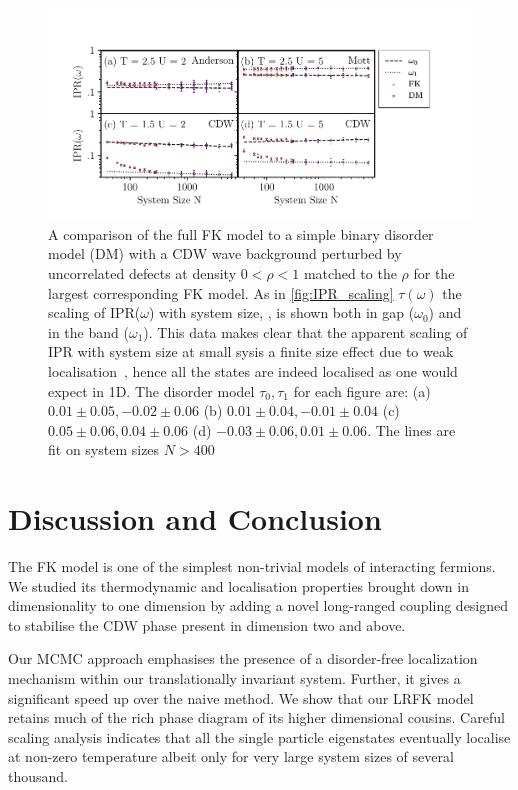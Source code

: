 \hypertarget{fig:DM_IPR_scaling}{%
\begin{figure}
\centering
\includegraphics[width=1\textwidth,height=\textheight]{figure_code/fk_chapter/disorder_model/DM_IPR_scaling}
\caption[{FK model compared to binary disorder model: IPR Scaling}]{A comparison of the full FK model to a simple binary disorder model (DM) with a CDW wave background perturbed by uncorrelated defects at density \(0 < \rho < 1\) matched to the \(\rho\) for the largest corresponding FK model. As in \cref{fig:IPR_scaling} \(\tau(\omega)\) the scaling of IPR(\(\omega\)) with system size, , is shown both in gap (\(\omega_0\)) and in the band (\(\omega_1\)). This data makes clear that the apparent scaling of IPR with system size at small sysis a finite size effect due to weak localisation~\autocite{antipovInteractionTunedAndersonMott2016}, hence all the states are indeed localised as one would expect in 1D. The disorder model \(\tau_0,\tau_1\) for each figure are: (a) \(0.01\pm0.05, -0.02\pm0.06\) (b) \(0.01\pm0.04, -0.01\pm0.04\) (c) \(0.05\pm0.06, 0.04\pm0.06\) (d) \(-0.03\pm0.06, 0.01\pm0.06\). The lines are fit on system sizes \(N > 400\)}
\label{fig:DM_IPR_scaling}
\end{figure}
}

\hypertarget{fk-conclusion}{%
\section{Discussion and Conclusion}\label{fk-conclusion}}

The FK model is one of the simplest non-trivial models of interacting fermions. We studied its thermodynamic and localisation properties brought down in dimensionality to one dimension by adding a novel long-ranged coupling designed to stabilise the CDW phase present in dimension two and above.

Our MCMC approach emphasises the presence of a disorder-free localization mechanism within our translationally invariant system. Further, it gives a significant speed up over the naive method. We show that our LRFK model retains much of the rich phase diagram of its higher dimensional cousins. Careful scaling analysis indicates that all the single particle eigenstates eventually localise at non-zero temperature albeit only for very large system sizes of several thousand.

